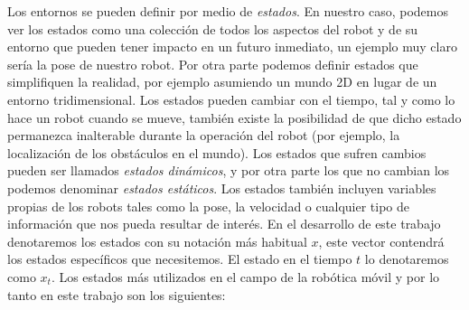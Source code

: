 Los entornos se pueden definir por medio de \textit{estados}.
En nuestro caso, podemos ver los estados como una colección de todos los aspectos del robot y de su entorno que pueden tener impacto en un futuro inmediato, un ejemplo muy claro sería la pose de nuestro robot. Por otra parte podemos definir estados que simplifiquen la realidad, por ejemplo asumiendo un mundo 2D en lugar de un entorno tridimensional.
%
%
%
%
%
Los estados pueden cambiar con el tiempo, tal y como lo hace un robot cuando se mueve, también existe la posibilidad de que dicho estado permanezca inalterable durante la operación del robot (por ejemplo, la localización de los obstáculos en el mundo).
Los estados que sufren cambios pueden ser llamados \textit{estados dinámicos}, y por otra parte los que no cambian los podemos denominar \textit{estados estáticos}.
Los estados también incluyen variables propias de los robots tales como la pose, la velocidad o cualquier tipo de información que nos pueda resultar de interés.
En el desarrollo de este trabajo denotaremos los estados con su notación más habitual $x$, este vector contendrá los estados específicos que necesitemos. El estado en el tiempo $t$ lo denotaremos como $x_{t}$. Los estados más utilizados en el campo de la robótica móvil y por lo tanto en este trabajo son los siguientes:
%
%
%
